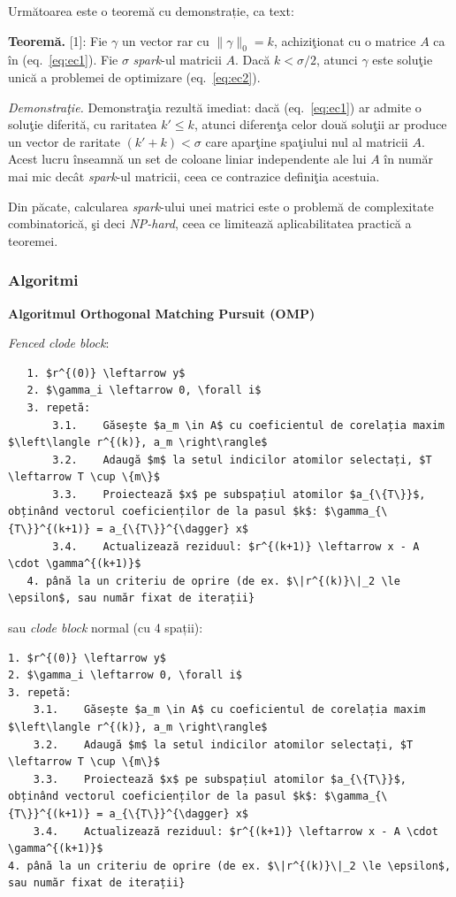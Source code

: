 \documentclass[]{article}
\begin{document}
Următoarea este o teoremă cu demonstrație, ca text:

\textbf{Teoremă.} {[}1{]}: Fie \(\gamma\) un vector rar cu
\(\|\gamma\|_0 = k\), achiziţionat cu o matrice \(A\) ca în
(eq.~\ref{eq:ec1}). Fie \(\sigma\) \emph{spark}-ul matricii \(A\). Dacă
\(k < \sigma / 2\), atunci \(\gamma\) este soluţie unică a problemei de
optimizare (eq.~\ref{eq:ec2}).

\emph{Demonstraţie.} Demonstraţia rezultă imediat: dacă
(eq.~\ref{eq:ec1}) ar admite o soluţie diferită, cu raritatea
\(k' \leq k\), atunci diferenţa celor două soluţii ar produce un vector
de raritate \((k'+k) < \sigma\) care aparţine spaţiului nul al matricii
\(A\). Acest lucru înseamnă un set de coloane liniar independente ale
lui \(A\) în număr mai mic decât \emph{spark}-ul matricii, ceea ce
contrazice definiţia acestuia.

Din păcate, calcularea \emph{spark}-ului unei matrici este o problemă de
complexitate combinatorică, şi deci \emph{NP-hard}, ceea ce limitează
aplicabilitatea practică a teoremei.

\subsubsection{Algoritmi}\label{algoritmi}

\textbf{Algoritmul Orthogonal Matching Pursuit (OMP)}

\emph{Fenced clode block}:

\begin{verbatim}
   1. $r^{(0)} \leftarrow y$
   2. $\gamma_i \leftarrow 0, \forall i$
   3. repetă:  
       3.1.    Găsește $a_m \in A$ cu coeficientul de corelația maxim $\left\langle r^{(k)}, a_m \right\rangle$  
       3.2.    Adaugă $m$ la setul indicilor atomilor selectați, $T \leftarrow T \cup \{m\}$  
       3.3.    Proiectează $x$ pe subspațiul atomilor $a_{\{T\}}$, obținând vectorul coeficienților de la pasul $k$: $\gamma_{\{T\}}^{(k+1)} = a_{\{T\}}^{\dagger} x$  
       3.4.    Actualizează reziduul: $r^{(k+1)} \leftarrow x - A \cdot \gamma^{(k+1)}$
   4. până la un criteriu de oprire (de ex. $\|r^{(k)}\|_2 \le \epsilon$, sau număr fixat de iterații}  
\end{verbatim}

sau \emph{clode block} normal (cu 4 spații):

\begin{verbatim}
1. $r^{(0)} \leftarrow y$
2. $\gamma_i \leftarrow 0, \forall i$
3. repetă:  
    3.1.    Găsește $a_m \in A$ cu coeficientul de corelația maxim $\left\langle r^{(k)}, a_m \right\rangle$  
    3.2.    Adaugă $m$ la setul indicilor atomilor selectați, $T \leftarrow T \cup \{m\}$  
    3.3.    Proiectează $x$ pe subspațiul atomilor $a_{\{T\}}$, obținând vectorul coeficienților de la pasul $k$: $\gamma_{\{T\}}^{(k+1)} = a_{\{T\}}^{\dagger} x$  
    3.4.    Actualizează reziduul: $r^{(k+1)} \leftarrow x - A \cdot \gamma^{(k+1)}$
4. până la un criteriu de oprire (de ex. $\|r^{(k)}\|_2 \le \epsilon$, sau număr fixat de iterații}  
\end{verbatim}
\end{document}
